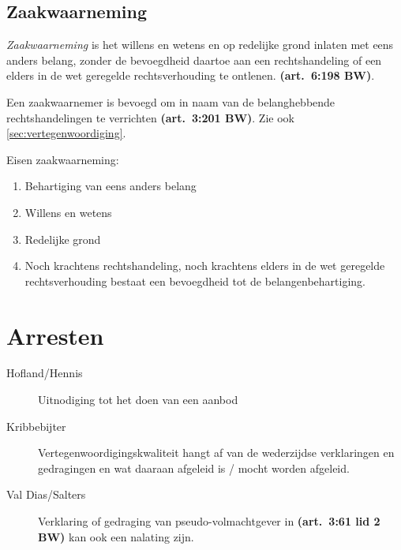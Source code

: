 \documentclass[a4paper]{article}
\newcommand{\art}[1]{\textbf{(art.~#1 BW)}\xspace}
\begin{document}
\subsection{Zaakwaarneming}

\emph{Zaakwaarneming} is het willens en wetens en op redelijke grond inlaten
met eens anders belang, zonder de bevoegdheid daartoe aan een rechtshandeling
of een elders in de wet geregelde rechtsverhouding te ontlenen. \art{6:198}.

Een zaakwaarnemer is bevoegd om in naam van de belanghebbende
rechtshandelingen te verrichten \art{3:201}. Zie ook
\ref{sec:vertegenwoordiging}.

Eisen zaakwaarneming:
\begin{enumerate}
  \item Behartiging van eens anders belang
  \item Willens en wetens
  \item Redelijke grond
  \item Noch krachtens rechtshandeling, noch krachtens elders in de wet
    geregelde rechtsverhouding bestaat een bevoegdheid tot de
    belangenbehartiging.
\end{enumerate}

\section{Arresten}

\begin{description}
  \item[Hofland/Hennis] Uitnodiging tot het doen van een aanbod
  \item[Kribbebijter] Vertegenwoordigingskwaliteit hangt af van de wederzijdse
    verklaringen en gedragingen en wat daaraan afgeleid is / mocht worden
    afgeleid.
  \item[Val Dias/Salters] Verklaring of gedraging van pseudo-volmachtgever in
    \art{3:61 lid 2} kan ook een nalating zijn.
\end{description}
\end{document}
